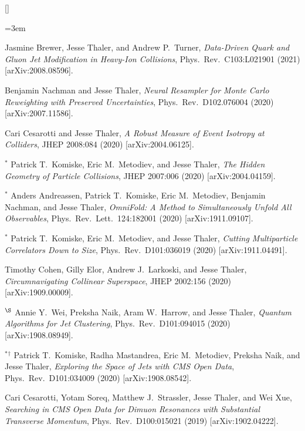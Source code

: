 \begin{list}{[]\addtocounter{jessecount}{-1}}{\leftmargin=3em \itemsep=4pt}
\item
 Jasmine Brewer, Jesse Thaler, and Andrew P.\ Turner,
\emph{Data-Driven Quark and Gluon Jet Modification in Heavy-Ion Collisions},
Phys.\ Rev.\ C103:L021901 (2021)
[arXiv:2008.08596].

\item
 Benjamin Nachman and Jesse Thaler,
\emph{Neural Resampler for Monte Carlo Reweighting with Preserved Uncertainties},
Phys.\ Rev.\ D102.076004 (2020)
[arXiv:2007.11586].

\item
 Cari Cesarotti and Jesse Thaler,
\emph{A Robust Measure of Event Isotropy at Colliders},
JHEP 2008:084 (2020)
[arXiv:2004.06125].

\item
${}^\ast$ Patrick T.\ Komiske, Eric M.\ Metodiev, and Jesse Thaler,
\emph{The Hidden Geometry of Particle Collisions},
JHEP 2007:006 (2020)
[arXiv:2004.04159].

\item
${}^\ast$ Anders Andreassen, Patrick T.\ Komiske, Eric M.\ Metodiev, Benjamin Nachman, and Jesse Thaler,
\emph{OmniFold: A Method to Simultaneously Unfold All Observables},
Phys.\ Rev.\ Lett.\ 124:182001 (2020)
[arXiv:1911.09107].

\item
${}^\ast$ Patrick T.\ Komiske, Eric M.\ Metodiev, and Jesse Thaler,
\emph{Cutting Multiparticle Correlators Down to Size},
Phys.\ Rev.\ D101:036019 (2020)
[arXiv:1911.04491].

\item
 Timothy Cohen, Gilly Elor, Andrew J.\ Larkoski, and Jesse Thaler,
\emph{Circumnavigating Collinear Superspace},
JHEP 2002:156 (2020)
[arXiv:1909.00009].

\item
${}^\S$ Annie Y.\ Wei, Preksha Naik, Aram W.\ Harrow, and Jesse Thaler,
\emph{Quantum Algorithms for Jet Clustering},
Phys.\ Rev.\ D101:094015 (2020)
[arXiv:1908.08949].

\item
${}^\ast$${}^\dagger$ Patrick T.\ Komiske, Radha Mastandrea, Eric M.\ Metodiev, Preksha Naik, and Jesse Thaler,
\emph{Exploring the Space of Jets with CMS Open Data},
Phys.\ Rev.\ D101:034009 (2020)
[arXiv:1908.08542].

\item
 Cari Cesarotti, Yotam Soreq, Matthew J.\ Strassler, Jesse Thaler, and Wei Xue,
\emph{Searching in CMS Open Data for Dimuon Resonances with Substantial Transverse Momentum},
Phys.\ Rev.\ D100:015021 (2019)
[arXiv:1902.04222].


\end{list}
